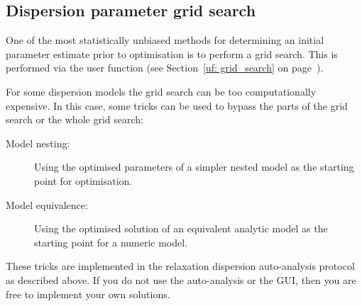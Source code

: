 
\subsection{Dispersion parameter grid search}

One of the most statistically unbiased methods for determining an initial parameter estimate prior to optimisation is to perform a grid search.
This is performed via the  user function (see Section~\ref{uf: grid_search} on page~\pageref{uf: grid_search}).


For some dispersion models the grid search can be too computationally expensive.
In this case, some tricks can be used to bypass the parts of the grid search or the whole grid search:
\begin{description}
\item[Model nesting:]  Using the optimised parameters of a simpler nested model as the starting point for optimisation.
\item[Model equivalence:]  Using the optimised solution of an equivalent analytic model as the starting point for a numeric model.
\end{description}
These tricks are implemented in the relaxation dispersion auto-analysis protocol as described above.
If you do not use the auto-analysis or the GUI, then you are free to implement your own solutions.

